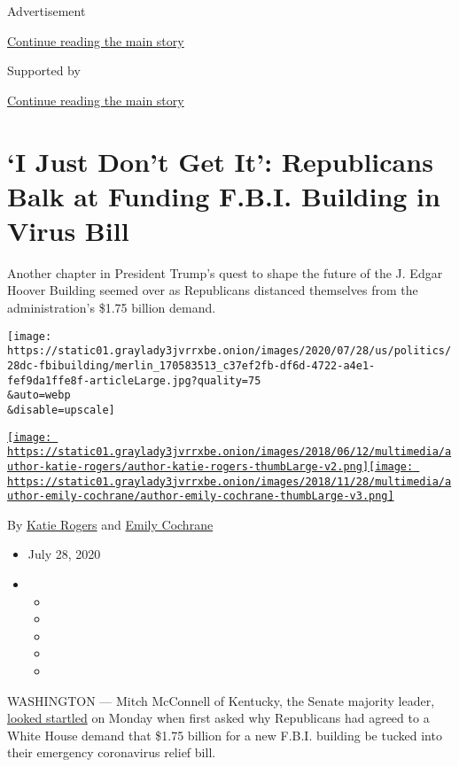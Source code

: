 Advertisement

\protect\hyperlink{after-top}{Continue reading the main story}

Supported by

\protect\hyperlink{after-sponsor}{Continue reading the main story}

\hypertarget{i-just-dont-get-it-republicans-balk-at-funding-fbi-building-in-virus-bill}{%
\section{`I Just Don't Get It': Republicans Balk at Funding F.B.I.
Building in Virus
Bill}\label{i-just-dont-get-it-republicans-balk-at-funding-fbi-building-in-virus-bill}}

Another chapter in President Trump's quest to shape the future of the J.
Edgar Hoover Building seemed over as Republicans distanced themselves
from the administration's \$1.75 billion demand.

\texttt{[image: https://static01.graylady3jvrrxbe.onion/images/2020/07/28/us/politics/28dc-fbibuilding/merlin\_170583513\_c37ef2fb-df6d-4722-a4e1-fef9da1ffe8f-articleLarge.jpg?quality=75\\\&auto=webp\\\&disable=upscale]}

\href{https://www.nytimes3xbfgragh.onion/by/katie-rogers}{\texttt{[image: https://static01.graylady3jvrrxbe.onion/images/2018/06/12/multimedia/author-katie-rogers/author-katie-rogers-thumbLarge-v2.png]}}\href{https://www.nytimes3xbfgragh.onion/by/emily-cochrane}{\texttt{[image: https://static01.graylady3jvrrxbe.onion/images/2018/11/28/multimedia/author-emily-cochrane/author-emily-cochrane-thumbLarge-v3.png]}}

By \href{https://www.nytimes3xbfgragh.onion/by/katie-rogers}{Katie
Rogers} and
\href{https://www.nytimes3xbfgragh.onion/by/emily-cochrane}{Emily
Cochrane}

\begin{itemize}
\item
  July 28, 2020
\item
  \begin{itemize}
  \item
  \item
  \item
  \item
  \item
  \end{itemize}
\end{itemize}

WASHINGTON --- Mitch McConnell of Kentucky, the Senate majority leader,
\href{https://twitter.com/NBCNews/status/1288150687109599232?s=20}{looked
startled} on Monday when first asked why Republicans had agreed to a
White House demand that \$1.75 billion for a new F.B.I. building be
tucked into their emergency coronavirus relief bill.

